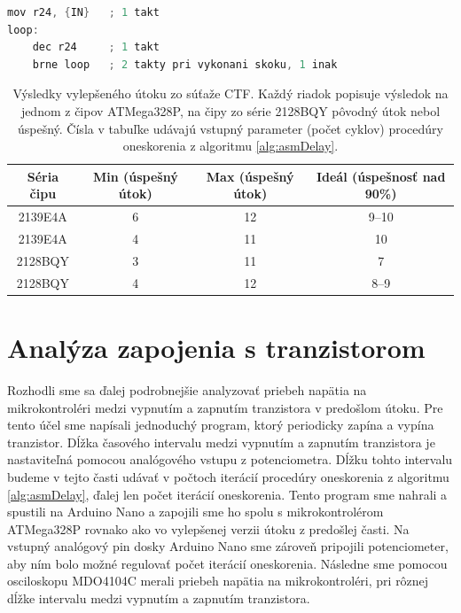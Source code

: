 \begin{lstlisting}[float,language=C,caption={Procedúra oneskorenia v asembleri. \{IN\} označuje vstupný parameter -- 8-bitová konštanta, alebo hodnota v registri.},label=alg:asmDelay]
mov r24, {IN}   ; 1 takt
loop:
    dec r24     ; 1 takt
    brne loop   ; 2 takty pri vykonani skoku, 1 inak
\end{lstlisting}

\begin{table}
    \caption[Výsledky vylepšeného útoku zo súťaže CTF]{Výsledky vylepšeného útoku zo súťaže CTF. Každý riadok popisuje výsledok na jednom z čipov ATMega328P, na čipy zo série 2128BQY pôvodný útok nebol úspešný. Čísla v tabuľke udávajú vstupný parameter (počet cyklov) procedúry oneskorenia z algoritmu \ref{alg:asmDelay}.}
    \label{tab:vccOnTheCheap2}
    \begin{center}
    \begin{tabular}{|c|c|c|c|}
        \hline 
        Séria čipu & Min (úspešný útok) & Max (úspešný útok) & Ideál (úspešnosť nad 90\%) \\
        \hline
        2139E4A & 6 & 12 & 9--10 \\
        \hline
        2139E4A & 4 & 11 & 10 \\
        \hline
        2128BQY & 3 & 11 & 7 \\
        \hline
        2128BQY & 4 & 12 & 8--9 \\
        \hline
    \end{tabular}
    \end{center}
\end{table}

\section{Analýza zapojenia s tranzistorom}
Rozhodli sme sa ďalej podrobnejšie analyzovať priebeh napätia na mikrokontroléri medzi vypnutím a zapnutím tranzistora v predošlom útoku. Pre tento účel sme napísali jednoduchý program, ktorý periodicky zapína a vypína tranzistor. Dĺžka časového intervalu medzi vypnutím a zapnutím tranzistora je nastaviteľná pomocou analógového vstupu z potenciometra. Dĺžku tohto intervalu budeme v tejto časti udávať v počtoch iterácií procedúry oneskorenia z algoritmu \ref{alg:asmDelay}, ďalej len počet iterácií oneskorenia. Tento program sme nahrali a spustili na Arduino Nano a zapojili sme ho spolu s mikrokontrolérom ATMega328P rovnako ako vo vylepšenej verzii útoku z predošlej časti. Na vstupný analógový pin dosky Arduino Nano sme zároveň pripojili potenciometer, aby ním bolo možné regulovať počet iterácií oneskorenia. Následne sme pomocou osciloskopu MDO4104C merali priebeh napätia na mikrokontroléri, pri rôznej dĺžke intervalu medzi vypnutím a zapnutím tranzistora.

